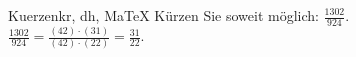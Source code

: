 \begin{MAufgabe}{Kuerzen}{kr, dh, MaTeX}
K\"urzen Sie soweit m\"oglich: $\frac{1302}{924}$.\\ 
\ifLsg\MLoesung
\quad $\frac{1302}{924}=\frac{(42)\cdot(31)}{(42)\cdot(22)}=\frac{31}{22}$.\else\relax\fi
 \end{MAufgabe}